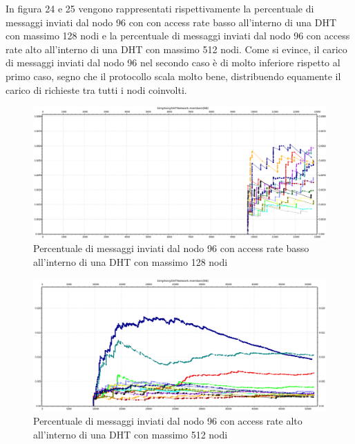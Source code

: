 \documentclass[	
	DIV=calc,
	paper=a4,
	fontsize=11pt,
	onecolumn
]{scrartcl} %
\begin{document}
	In figura 24 e 25 vengono rappresentati rispettivamente la percentuale di messaggi inviati dal nodo 96 con con access rate basso all'interno di una DHT con massimo 128 nodi e la percentuale di messaggi inviati dal nodo 96 con access rate alto all'interno di una DHT con massimo 512 nodi. Come si evince, il carico di messaggi inviati dal nodo 96 nel secondo caso è di molto inferiore rispetto al primo caso, segno che il protocollo scala molto bene, distribuendo equamente il carico di richieste tra tutti i nodi coinvolti.
	
	\begin{figure}[H]
		\centering
		\includegraphics[scale=0.35]	{SymphonyDHT/plots/PercentageOfMessagesSent/128_Nodes_SlowAccess/SymphonyDHT_128Nodes_SlowAccess_Node96.png}
		\caption{Percentuale di messaggi inviati dal nodo 96 con access rate basso all'interno di una DHT con massimo 128 nodi}
		\label{Figura 24}
	\end{figure}
	\begin{figure}[H]
		\centering
		\includegraphics[scale=0.35]	{SymphonyDHT/plots/PercentageOfMessagesSent/512_Nodes_FastAccess/SymphonyDHT_512Nodes_FastAccess_Node96.png}
		\caption{Percentuale di messaggi inviati dal nodo 96 con access rate alto all'interno di una DHT con massimo 512 nodi}
		\label{Figura 25}
	\end{figure}		
	
\end{document}
